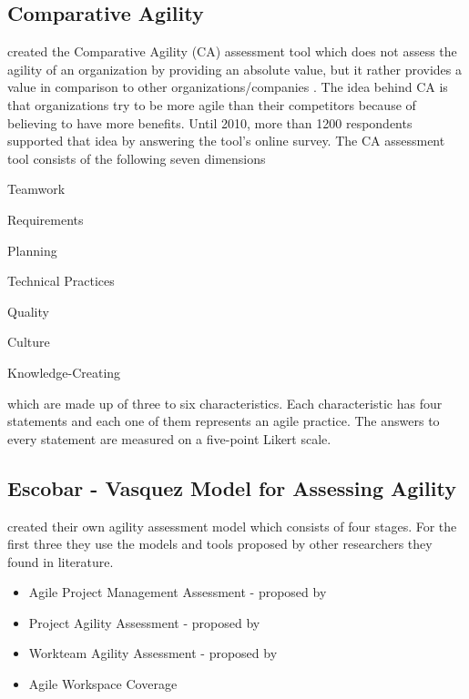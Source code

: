 \subsection{Comparative Agility} %
\citet{comparative_agility} created the Comparative Agility (CA) assessment tool which does not assess the agility of an organization by providing an absolute value, but it rather provides a value in comparison to other organizations/companies \cite{comparative_agility_web}. The idea behind CA is that organizations try to be more agile than their competitors because of believing to have more benefits. Until 2010, more than 1200 respondents supported that idea by answering the tool's online survey. The CA assessment tool consists of the following seven dimensions 
\begin{inparaenum} [a\upshape)]
	\item Teamwork
	\item Requirements
	\item Planning
	\item Technical Practices
	\item Quality
	\item Culture
	\item Knowledge-Creating
\end{inparaenum}
which are made up of three to six characteristics. Each characteristic has four statements and each one of them represents an agile practice. The answers to every statement are measured on a five-point Likert scale.

\subsection{Escobar - Vasquez Model for Assessing Agility} %

\citet{6427226} created their own agility assessment model which consists of four stages. For the first three they use the models and tools proposed by other researchers they found in literature.
\begin{itemize}
\item Agile Project Management Assessment - proposed by \citet{qumer2006measuring}
\item Project Agility Assessment - proposed by \citet{taylor}
\item Workteam Agility Assessment - proposed by \citet{Leffingwell}
\item Agile Workspace Coverage
\end{itemize}

